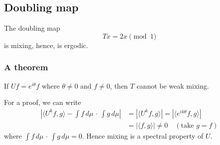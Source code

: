 \documentclass{article}
\begin{document}
\subsection{Doubling map}

The doubling map 
\[
Tx = 2x \pmod 1
\]
is mixing, hence, is ergodic.

\subsubsection{A theorem}

If $Uf=e^{i\theta}f$ where $\theta\neq 0$ and $f\neq 0$, then $T$ cannot be weak mixing.

For a proof, we can write 
\begin{align*}
    \left|\langle U^k f, g\rangle - \int f\,d\mu\,\cdot\, \int g\,d\mu\right| &= \left|\langle U^k f, g\rangle\right| = \left|\langle e^{ik\theta} f, g\rangle\right|\\
    &= |\langle f, g \rangle| \neq 0 \quad (\text{take }g=f)
\end{align*}
where $\int f\,d\mu\,\cdot\, \int g\,d\mu=0$. Hence mixing is a spectral property of $U$.
\end{document}
